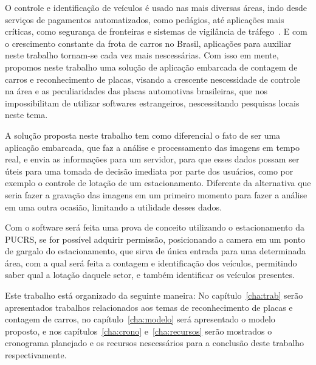 
O controle e identificação de veículos é usado nas mais diversas áreas, indo
desde serviços de pagamentos automatizados, como pedágios, até aplicações mais
críticas, como segurança de fronteiras e sistemas de vigilância de
tráfego~\cite{ahmad2015automatic}. E com o crescimento constante da frota de
carros no Brasil, aplicações para auxiliar neste trabalho tornam-se cada vez
mais nescessárias.  Com isso em mente, propomos neste trabalho uma solução de
aplicação embarcada de contagem de carros e reconhecimento de placas, visando a
crescente nescessidade de controle na área e as peculiaridades das placas
automotivas brasileiras, que nos impossibilitam de utilizar softwares
estrangeiros, nescessitando pesquisas locais neste tema.

A solução proposta neste trabalho tem como diferencial o fato de ser uma
aplicação embarcada, que faz a análise e processamento das imagens em tempo
real, e envia as informações para um servidor, para que esses dados possam ser
úteis para uma tomada de decisão imediata por parte dos usuários, como por
exemplo o controle de lotação de um estacionamento. Diferente da alternativa que
seria fazer a gravação das imagens em um primeiro momento para fazer a análise
em uma outra ocasião, limitando a utilidade desses dados.

Com o software será feita uma prova de conceito utilizando o estacionamento da
PUCRS, se for possível adquirir permissão, posicionando a camera em um ponto de
gargalo do estacionamento, que sirva de única entrada para uma determinada área,
com a qual será feita a contagem e identificação dos veículos, permitindo saber
qual a lotação daquele setor, e também identificar os veículos presentes.

Este trabalho está organizado da seguinte maneira: No capítulo~\ref{cha:trab}
serão apresentados trabalhos relacionados aos temas de reconhecimento de placas
e contagem de carros, no capítulo~\ref{cha:modelo} será apresentado o modelo
proposto, e nos capítulos~\ref{cha:crono}  e~\ref{cha:recursos} serão mostrados
o cronograma planejado e os recursos nescessários para a conclusão deste
trabalho respectivamente.







